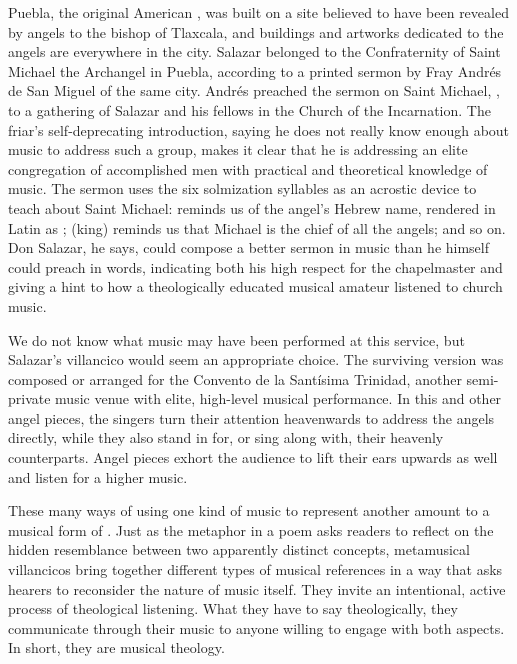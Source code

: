 Puebla, the original American , was built on a site
believed to have been revealed by angels to the bishop of Tlaxcala, and
buildings and artworks dedicated to the angels are everywhere in the city.%
    \Autocites
    {AngelContreras:Puebla}
    {Garcia-Castellanos:Puebla-Utopia}
    {Davies:HarmonyConversion}
Salazar belonged to the Confraternity of Saint Michael the Archangel in Puebla,
according to a printed sermon by Fray Andrés de San Miguel of the same city.
Andrés preached the sermon on Saint Michael, , to a gathering of Salazar and his fellows in the Church
of the Incarnation.%
    \Autocite[65--95]{SanMiguel:Sermones} %
The friar's self-deprecating introduction, saying he does not really know enough
about music to address such a group, makes it clear that he is addressing an
elite congregation of accomplished men with practical and theoretical knowledge
of music.
The sermon uses the six solmization syllables as an acrostic device to
teach about Saint Michael:  reminds us of the angel's Hebrew name,
rendered in Latin as ;  (king) reminds us that
Michael is the chief of all the angels; and so on.
Don Salazar, he says, could compose a better sermon in music than he himself
could preach in words, indicating both his high respect for the chapelmaster
and giving a hint to how a theologically educated musical amateur listened to
church music.

We do not know what music may have been performed at this service, but
Salazar's villancico  would seem an appropriate choice.
The surviving version was composed or arranged for the Convento de la Santísima
Trinidad, another semi-private music venue with elite, high-level musical
performance.
In this and other angel pieces, the singers turn their attention heavenwards to
address the angels directly, while they also stand in for, or sing along
with, their heavenly counterparts.
Angel pieces exhort the audience to lift their ears upwards as well and listen
for a higher music.

These many ways of using one kind of music to represent another amount to a
musical form of .
Just as the metaphor in a  poem asks readers to reflect
on the hidden resemblance between two apparently distinct concepts, metamusical
villancicos bring together different types of musical references in a way that
asks hearers to reconsider the nature of music itself.
They invite an intentional, active process of theological listening.
What they have to say theologically, they communicate through their music to
anyone willing to engage with both aspects.
In short, they are musical theology.

